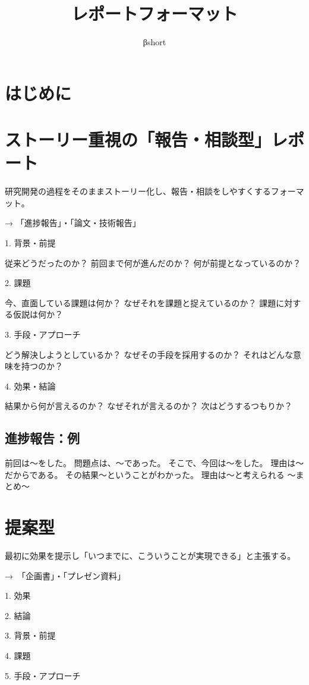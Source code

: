 \documentclass[uplatex, a4j]{jarticle}
\begin{document}
\title{レポートフォーマット}
\author{βshort}
\date{}

\maketitle

\section{はじめに}

\section{ストーリー重視の「報告・相談型」レポート}
研究開発の過程をそのままストーリー化し、報告・相談をしやすくするフォーマット。

→ 「進捗報告」・「論文・技術報告」

1. 背景・前提

従来どうだったのか？
前回まで何が進んだのか？
何が前提となっているのか？

2. 課題

今、直面している課題は何か？
なぜそれを課題と捉えているのか？
課題に対する仮説は何か？

3. 手段・アプローチ

どう解決しようとしているか？
なぜその手段を採用するのか？
それはどんな意味を持つのか？

4. 効果・結論

結果から何が言えるのか？
なぜそれが言えるのか？
次はどうするつもりか？

\subsection{進捗報告：例}
前回は〜をした。
問題点は、〜であった。
そこで、今回は〜をした。
理由は〜だからである。
その結果〜ということがわかった。
理由は〜と考えられる
〜まとめ〜


\section{提案型}
最初に効果を提示し「いつまでに、こういうことが実現できる」と主張する。

→　「企画書」・「プレゼン資料」

1. 効果

2. 結論

3. 背景・前提

4. 課題

5. 手段・アプローチ
\end{document}
